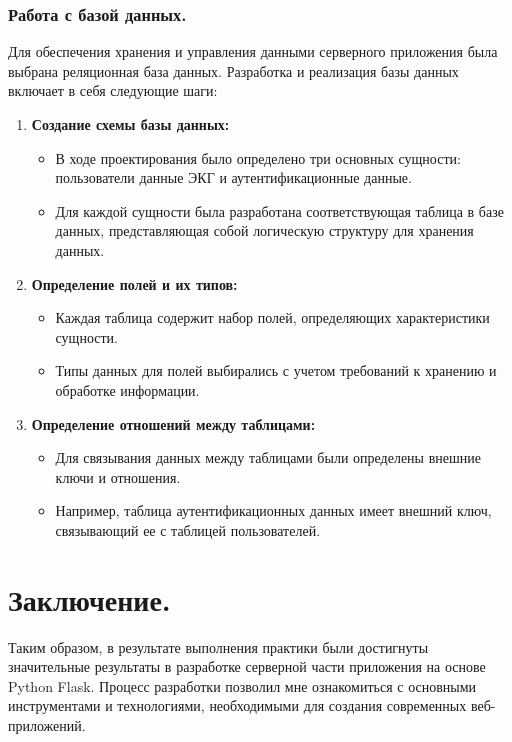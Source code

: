 \documentclass[12pt, russian]{extarticle}
\begin{document}
\begin{spacing}{1.5}
    \subsubsection{Работа с базой данных.}

    Для обеспечения хранения и управления данными серверного приложения была
    выбрана реляционная база данных. Разработка и реализация базы данных включает в себя следующие шаги:

    \begin{enumerate}
        \item \textbf{Создание схемы базы данных:}
            \begin{itemize}
                \item В ходе проектирования было определено три основных сущности: пользователи
                    данные ЭКГ и аутентификационные данные.
                \item Для каждой сущности была разработана соответствующая таблица в базе данных,
                    представляющая собой логическую структуру для хранения данных.
            \end{itemize}
        \item \textbf{Определение полей и их типов:}
            \begin{itemize}
                \item Каждая таблица содержит набор полей, определяющих характеристики сущности.
                \item Типы данных для полей выбирались с учетом требований к хранению и обработке информации.
            \end{itemize}
        \item \textbf{Определение отношений между таблицами:}
            \begin{itemize}
                \item Для связывания данных между таблицами были определены внешние ключи и отношения.
                \item Например, таблица аутентификационных данных имеет внешний ключ, связывающий ее с таблицей пользователей.
            \end{itemize}
    \end{enumerate}

    \newpage
    \section{Заключение.}

    Таким образом, в результате выполнения практики были достигнуты значительные
    результаты в разработке серверной части приложения на основе Python Flask.
    Процесс разработки позволил мне ознакомиться с основными инструментами и технологиями,
    необходимыми для создания современных веб-приложений.


\end{spacing}
\end{document}
